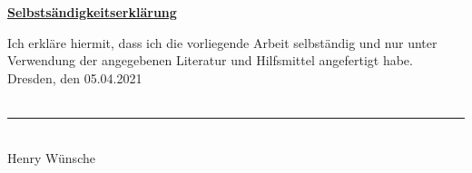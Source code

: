 \begin{center}
\textbf{\underline{Selbstsändigkeitserklärung}}\\
\end{center}
\vspace{0.5cm}
Ich erkläre hiermit, dass ich die vorliegende Arbeit selbständig und nur unter Verwendung der
angegebenen Literatur und Hilfsmittel angefertigt habe.\\

Dresden, den 05.04.2021\\
\vspace{1cm}\\
\rule[0pt]{6cm}{0.4pt}\\
Henry Wünsche
\vfill